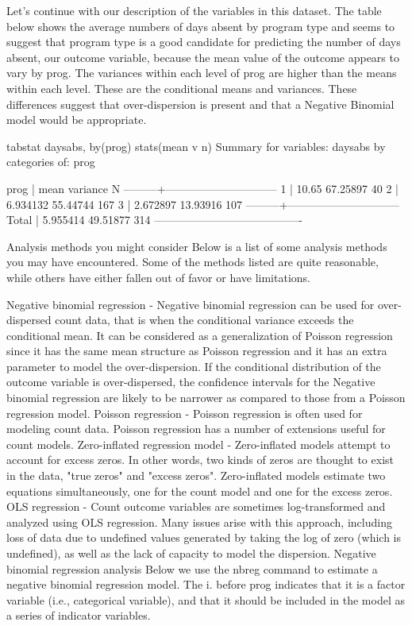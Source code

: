 Let's continue with our description of the variables in this dataset. The table below shows the average numbers of days absent by program type and seems to suggest that program type is a good candidate for predicting the number of days absent, our outcome variable, because the mean value of the outcome appears to vary by prog. The variances within each level of prog are higher than the means within each level. These are the conditional means and variances. These differences suggest that over-dispersion is present and that a Negative Binomial model would be appropriate. 

tabstat daysabs, by(prog) stats(mean v n)
Summary for variables: daysabs
by categories of: prog 

prog |      mean  variance         N
---------+------------------------------
1 |     10.65  67.25897        40
2 |  6.934132  55.44744       167
3 |  2.672897  13.93916       107
---------+------------------------------
Total |  5.955414  49.51877       314
----------------------------------------

Analysis methods you might consider
Below is a list of some analysis methods you may have encountered.  Some of the methods listed are quite reasonable, while others have either fallen out of favor or have limitations.  

Negative binomial regression - Negative binomial regression can be used for over-dispersed count data, that is when the conditional variance exceeds the conditional mean. It can be considered as a generalization of Poisson regression since it has the same mean structure as Poisson regression and it has an extra parameter to model the over-dispersion. If the conditional distribution of the outcome variable is over-dispersed, the confidence intervals for the Negative binomial regression are likely to be narrower as compared to those from a Poisson regression model.
Poisson regression - Poisson regression is often used for modeling count data. Poisson regression has a number of extensions useful for count models. 
Zero-inflated regression model - Zero-inflated models attempt to account for excess zeros.  In other words, two kinds of zeros are thought to exist in the data, "true zeros" and "excess zeros".  Zero-inflated models estimate two equations simultaneously, one for the count model and one for the excess zeros.
OLS regression - Count outcome variables are sometimes log-transformed and analyzed using OLS regression.  Many issues arise with this approach, including loss of data due to undefined values generated by taking the log of zero (which is undefined), as well as the lack of capacity to model the dispersion.
Negative binomial regression analysis
Below we use the nbreg command to estimate a negative binomial regression model.  The i. before prog indicates that it is a factor variable (i.e., categorical variable), and that it should be included in the model as a series of indicator variables.  


